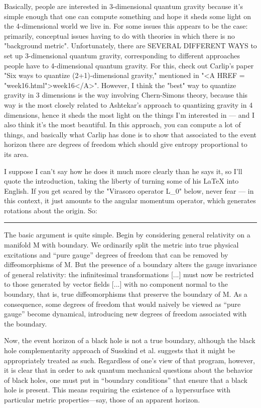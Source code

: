 Basically, people are interested in 3-dimensional quantum gravity
because it's simple enough that one can compute something and hope it
sheds some light on the 4-dimensional world we live in.  For some issues
this appears to be the case: primarily, conceptual issues having to do
with theories in which there is no "background metric".  Unfortunately,
there are SEVERAL DIFFERENT WAYS to set up 3-dimensional quantum
gravity, corresponding to different approaches people have to
4-dimensional quantum gravity.  For this, check out Carlip's paper "Six
ways to quantize (2+1)-dimensional gravity," mentioned in "<A HREF = "week16.html">week16</A>".
However, I think the "best" way to quantize gravity in 3 dimensions is
the way involving Chern-Simons theory, because this way is the most
closely related to Ashtekar's approach to quantizing gravity in 4
dimensions, hence it sheds the most light on the things I'm interested
in --- and I also think it's the most beautiful.  In this approach, you
can compute a lot of things, and basically what Carlip has done is to
show that associated to the event horizon there are degrees of freedom
which should give entropy proportional to its area.

I suppose I can't say how he does it much more clearly than he says it,
so I'll quote the introduction, taking the liberty of turning some of
his LaTeX into English.  If you get scared by the "Virasoro operator
L_0" below, never fear --- in this context, it just amounts to the
angular momentum operator, which generates rotations about the origin.
So:

\par\noindent\rule{\textwidth}{0.4pt}
The basic argument is quite simple.  Begin by considering general
relativity on a manifold M with boundary.  We ordinarily split the
metric into true physical excitations and ``pure gauge'' degrees of
freedom that can be removed by diffeomorphisms of M.  But the presence
of a boundary alters the gauge invariance of general relativity: the
infinitesimal transformations [...] must now be restricted to those
generated by vector fields [...] with no component normal to the
boundary, that is, true diffeomorphisms that preserve the boundary of M.
As a consequence, some degrees of freedom that would naively be viewed
as ``pure gauge'' become dynamical, introducing new degrees of freedom
associated with the boundary.

Now, the event horizon of a black hole is not a true boundary, although
the black hole complementarity approach of Susskind et al. suggests
that it might be appropriately treated as such.  Regardless of one's
view of that program, however, it is clear that in order to ask quantum
mechanical questions about the behavior of black holes, one must put in
``boundary conditions'' that ensure that a black hole is present.  This
means requiring the existence of a hypersurface with particular metric
properties---say, those of an apparent horizon.

